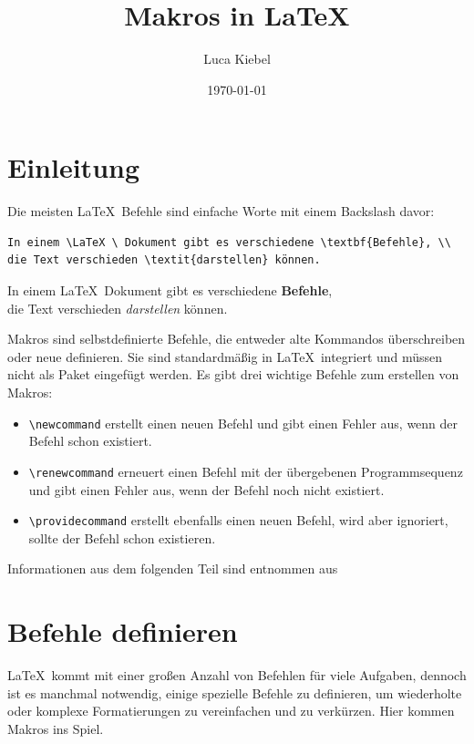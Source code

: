 \documentclass[ngerman,12pt,titlepage]{scrartcl}
\title{Makros in \LaTeX}
\author{Luca Kiebel}
\date{\today}
\newenvironment{hlbox}{\begin{tcolorbox}[enhanced,colback=white,colframe=white,sharpish corners,fuzzy halo=0.5mm with lightgray]}{\end{tcolorbox}}
\begin{document}
\maketitle
\newpage
	\tableofcontents
\newpage

\section{Einleitung}
\label{sec:Einleitung}
Die meisten \LaTeX \ Befehle sind einfache Worte mit einem Backslash davor:
\begin{lstlisting}[caption = Befehle]
In einem \LaTeX \ Dokument gibt es verschiedene \textbf{Befehle}, \\
die Text verschieden \textit{darstellen} können.
\end{lstlisting} 
\begin{hlbox}
In einem \LaTeX \ Dokument gibt es verschiedene \textbf{Befehle}, \\
die Text verschieden \textit{darstellen} können.
\end{hlbox}
Makros sind selbstdefinierte Befehle, die entweder alte Kommandos überschreiben oder neue definieren.
Sie sind standardmäßig in \LaTeX \ integriert und müssen nicht als Paket eingefügt werden. 
Es gibt drei wichtige Befehle zum erstellen von Makros:\\
\begin{itemize}
\item[] \lstinline|\newcommand| erstellt einen neuen Befehl und gibt einen Fehler aus, wenn der Befehl schon existiert.
\item[] \lstinline|\renewcommand| erneuert einen Befehl mit der übergebenen Programmsequenz und gibt einen Fehler aus, wenn der Befehl noch nicht existiert. 
\item[] \lstinline|\providecommand| erstellt ebenfalls einen neuen Befehl, wird aber ignoriert, sollte der Befehl schon existieren.
\end{itemize}
Informationen aus dem folgenden Teil sind entnommen aus \cite{wiki:macros}

\section{Befehle definieren}
\label{sec:BefehleDef}
\LaTeX \ kommt mit einer großen Anzahl von Befehlen für viele Aufgaben, dennoch ist es manchmal notwendig, einige spezielle Befehle zu definieren, um wiederholte oder komplexe Formatierungen zu vereinfachen und zu verkürzen. Hier kommen Makros ins Spiel.
\newcommand{\R}{\( \mathbb{R} \)}
\end{document}
